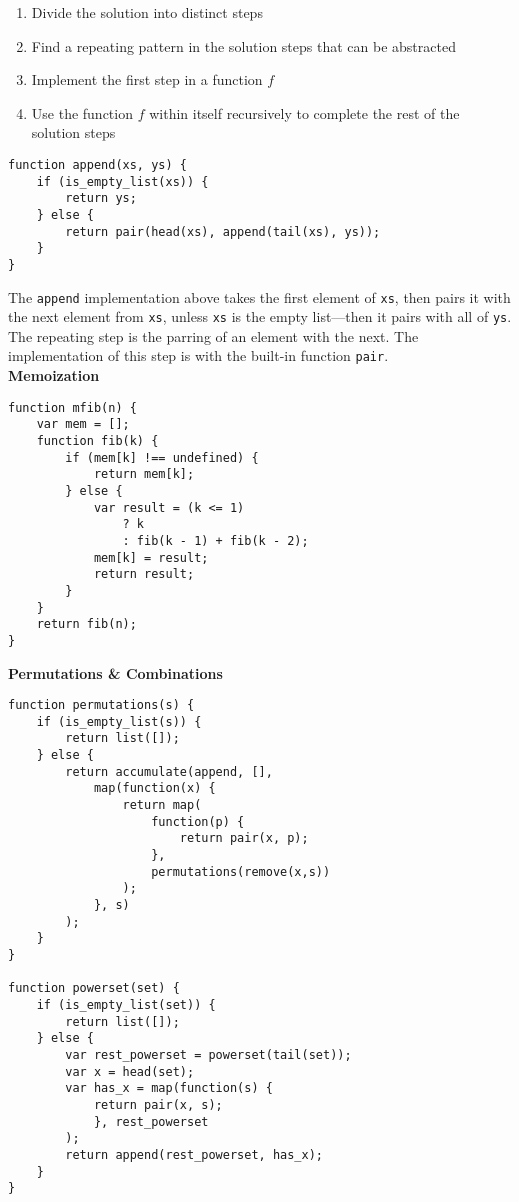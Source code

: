 \documentclass[a4paper]{article} \usepackage[backend=biber, style=numeric, sorting=none]{biblatex}
\begin{document}
\begin{multicols*}{4}
\begin{enumerate}
\itemsep -0.5em
\item Divide the solution into distinct steps
\item Find a repeating pattern in the solution steps that can be abstracted
\item Implement the first step in a function $f$
\item Use the function $f$ within itself recursively to complete the rest of the solution steps
\end{enumerate}

\begin{verbatim}
function append(xs, ys) {
    if (is_empty_list(xs)) {
        return ys;
    } else {
        return pair(head(xs), append(tail(xs), ys));
    }
}
\end{verbatim}

The \texttt{append} implementation above takes the first element of \texttt{xs}, then pairs it with the next element from \texttt{xs}, unless \texttt{xs} is the empty list---then it pairs with all of \texttt{ys}. The repeating step is the parring of an element with the next. The implementation of this step is with the built-in function \texttt{pair}.\\

{\small\textbf{Memoization}}
\begin{verbatim}
function mfib(n) {
    var mem = [];
    function fib(k) {
        if (mem[k] !== undefined) {
            return mem[k];
        } else {
            var result = (k <= 1)
                ? k
                : fib(k - 1) + fib(k - 2);
            mem[k] = result;
            return result;
        }
    }
    return fib(n);
}
\end{verbatim}

{\small\textbf{Permutations \& Combinations}}
\begin{verbatim}
function permutations(s) {
    if (is_empty_list(s)) {
        return list([]);
    } else {
        return accumulate(append, [],
            map(function(x) { 
                return map(
                    function(p) {
                        return pair(x, p);
                    }, 
                    permutations(remove(x,s))
                );
            }, s)
        );
    }
}

function powerset(set) {
    if (is_empty_list(set)) {
        return list([]);
    } else {
        var rest_powerset = powerset(tail(set));
        var x = head(set);
        var has_x = map(function(s) {
            return pair(x, s);
            }, rest_powerset
        );
        return append(rest_powerset, has_x);
    }
}
\end{verbatim}


\end{multicols*}
\end{document}

